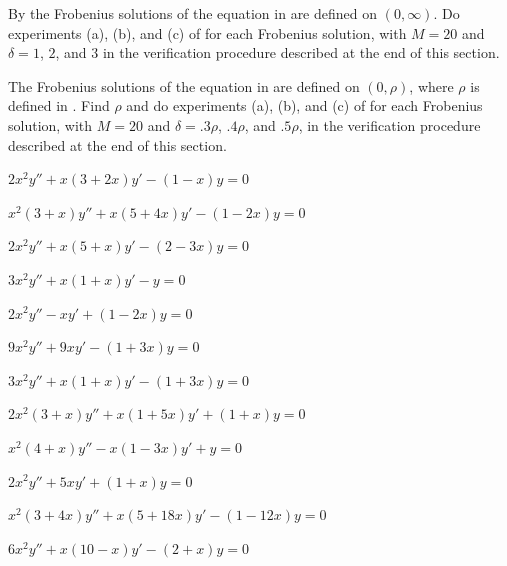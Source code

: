 \begin{exerciselist}
\item\label{exer:7.5.12}\Lex
By 
the Frobenius solutions of the equation in  are
defined on $(0,\infty)$. Do experiments (a), (b), and (c) of
 for each Frobenius solution, with $M=20$ and
$\delta=1$, $2$, and $3$ in the verification procedure described at
the end of this section.


\item\label{exer:7.5.13}\Lex
The Frobenius solutions of the equation in  are
defined on $(0,\rho)$, where $\rho$ is defined in
. Find $\rho$ and do experiments (a),
(b), and
(c) of  for each Frobenius solution, with
$M=20$ and $\delta=.3\rho$, $.4\rho$, and $.5\rho$, in the verification
procedure described at the end of this section.


\item\label{exer:7.5.14}$2x^2y''+x(3+2x)y'-(1-x)y=0$

\item\label{exer:7.5.15}$x^2(3+x)y''+x(5+4x)y'-(1-2x)y=0$

\item\label{exer:7.5.16}$2x^2y''+x(5+x)y'-(2-3x)y=0$

\item\label{exer:7.5.17}$3x^2y''+x(1+x)y'-y=0$

\item\label{exer:7.5.18}$2x^2y''-xy'+(1-2x)y=0$

\item\label{exer:7.5.19}$9x^2y''+9xy'-(1+3x)y=0$

\item\label{exer:7.5.20}$3x^2y''+x(1+x)y'-(1+3x)y=0$

\item\label{exer:7.5.21}$2x^2(3+x)y''+x(1+5x)y'+(1+x)y=0$

\item\label{exer:7.5.22}$x^2(4+x)y''-x(1-3x)y'+y=0$

\item\label{exer:7.5.23}$2x^2y''+5xy'+(1+x)y=0$

\item\label{exer:7.5.24}$x^2(3+4x)y''+x(5+18x)y'-(1-12x)y=0$

\item\label{exer:7.5.25}$6x^2y''+x(10-x)y'-(2+x)y=0$


\end{exerciselist}
